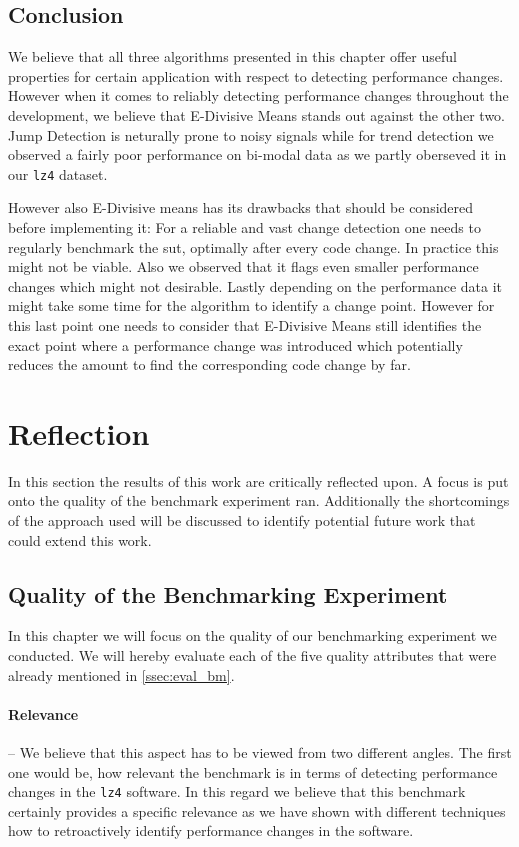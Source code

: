 \documentclass[	runningheads,
				a4paper]{llncs}
\begin{document}
\subsection{Conclusion}
We believe that all three algorithms presented in this chapter offer useful properties for certain application with respect to detecting performance changes. However when it comes to reliably detecting performance changes throughout the development, we believe that E-Divisive Means stands out against the other two. Jump Detection is neturally prone to noisy signals while for trend detection we observed a fairly poor performance on bi-modal data as we partly oberseved it in our \texttt{lz4} dataset.

However also E-Divisive means has its drawbacks that should be considered before implementing it: For a reliable and vast change detection one needs to regularly benchmark the \gls{sut}, optimally after every code change. In practice this might not be viable. Also we observed that it flags even smaller performance changes which might not desirable. Lastly depending on the performance data it might take some time for the algorithm to identify a change point. However for this last point one needs to consider that E-Divisive Means still identifies the exact point where a performance change was introduced which potentially reduces the amount to find the corresponding code change by far.

\section{Reflection}
In this section the results of this work are critically reflected upon. A focus is put onto the quality of the benchmark experiment ran. Additionally the shortcomings of the approach used will be discussed to identify potential future work that could extend this work.

	\subsection{Quality of the Benchmarking Experiment}
	\label{ssec:refl_quality}
	In this chapter we will focus on the quality of our benchmarking experiment we conducted. We will hereby evaluate each of the five quality attributes that were already mentioned in \autoref{ssec:eval_bm}.

	\paragraph{Relevance} -- We believe that this aspect has to be viewed from two different angles. The first one would be, how relevant the benchmark is in terms of detecting performance changes in the \texttt{lz4} software. In this regard we believe that this benchmark certainly provides a specific relevance as we have shown with different techniques how to retroactively identify performance changes in the software.
\end{document}
